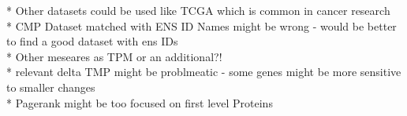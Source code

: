 {\color{lightgray}
* Other datasets could be used like TCGA which is common in cancer research \\
* CMP Dataset matched with ENS ID Names might be wrong - would be better to find a good dataset with ens IDs \\
* Other meseares as TPM or an additional?! \\
* relevant delta TMP might be problmeatic - some genes might be more sensitive to smaller changes \\
* Pagerank might be too focused on first level Proteins \\
}
